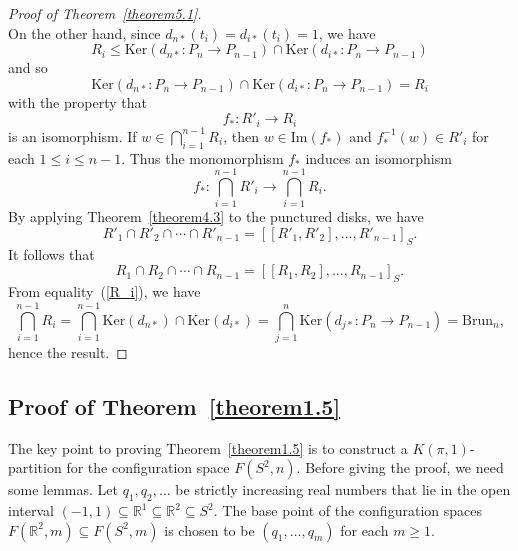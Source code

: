 \documentclass[10pt]{amsart}
\numberwithin{equation}{section}
\begin{document}
\begin{proof}[Proof of Theorem~\ref{theorem5.1}]
$$$$
On the other hand, since $d_{n*}(t_i)=d_{i*}(t_i)=1$, we have
$$
R_i\leq {\mathrm{K er}}(d_{n*}\colon P_n\to P_{n-1})\cap{\mathrm{K er}}(d_{i*}\colon P_n\to P_{n-1})
$$
and so
\begin{equation}\label{R_i}
{\mathrm{K er}}(d_{n*}\colon P_n\to P_{n-1})\cap{\mathrm{K er}}(d_{i*}\colon P_n\to P_{n-1})=R_i
\end{equation}
with the property that
$$
f_*\colon R'_i\longrightarrow R_i
$$
is an isomorphism. If $w\in \bigcap\limits_{i=1}^{n-1}R_i$, then $w\in \mathrm{Im}(f_*)$ and $f_*^{-1}(w)\in R'_i$ for each $1\leq i\leq n-1$. Thus the monomorphism $f_*$ induces an isomorphism
$$
f_*\colon \bigcap_{i=1}^{n-1}R'_i\longrightarrow \bigcap_{i=1}^{n-1} R_i.
$$
By applying Theorem~\ref{theorem4.3} to the punctured disks, we have
$$
R'_1\cap R'_2\cap\cdots\cap R'_{n-1}=[[R'_1,R'_2],\ldots,R'_{n-1}]_S.
$$
It follows that
$$
R_1\cap R_2\cap\cdots\cap R_{n-1}=[[R_1,R_2],\ldots,R_{n-1}]_S.
$$
From equality~(\ref{R_i}), we have
$$
\bigcap_{i=1}^{n-1} R_i=\bigcap_{i=1}^{n-1}{\mathrm{K er}}(d_{n*})\cap{\mathrm{K er}}(d_{i*})=\bigcap_{j=1}^{n}{\mathrm{K er}}(d_{j*}\colon P_n\to P_{n-1})={\mathrm{Brun}}_n,
$$
hence the result.
\end{proof}

\subsection{Proof of Theorem~\ref{theorem1.5}}
The key point to proving Theorem~\ref{theorem1.5} is to construct a $K(\pi,1)$-partition for the configuration space $F(S^2,n)$.
Before giving the proof, we need some lemmas. Let $q_1,q_2,\ldots$ be strictly increasing real numbers that lie in the open interval $(-1,1)\subseteq {\ensuremath{\mathbb{R}}}^1\subseteq {\ensuremath{\mathbb{R}}}^2\subseteq S^2$. The base point of the configuration spaces $F({\ensuremath{\mathbb{R}}}^2,m)\subseteq F(S^2,m)$ is chosen to be $(q_1,\ldots,q_m)$ for each $m\geq 1$.
\end{document}
